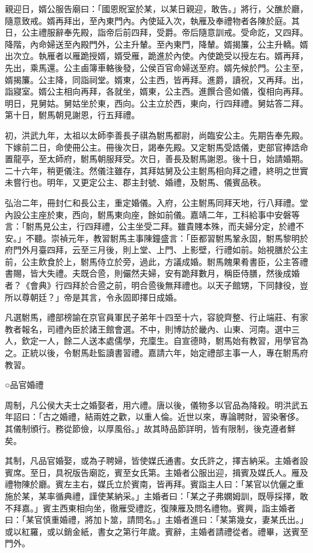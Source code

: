 親迎日，婿公服告廟曰：「國恩貺室於某，以某日親迎，敢告。」將行，父醮於廳，隨意致戒。婿再拜出，至內東門內。內使延入次，執雁及奉禮物者各陳於庭。其日，公主禮服辭奉先殿，詣帝后前四拜，受爵。帝后隨意訓戒。受命訖，又四拜。降階，內命婦送至內殿門外，公主升輦。至內東門，降輦。婿揭簾，公主升轎。婿出次立。執雁者以雁跪授婿，婿受雁，跪進於內使。內使跪受以授左右。婿再拜，先出，乘馬還。公主鹵簿車輅後發，公侯百官命婦送至府。婿先候於門。公主至，婿揭簾。公主降，同詣祠堂。婿東，公主西，皆再拜。進爵，讀祝，又再拜。出，詣寢室。婿公主相向再拜，各就坐，婿東，公主西。進饌合巹如儀，復相向再拜。明日，見舅姑。舅姑坐於東，西向。公主立於西，東向，行四拜禮。舅姑答二拜。第十日，駙馬朝見謝恩，行五拜禮。

初，洪武九年，太祖以太師李善長子祺為駙馬都尉，尚臨安公主。先期告奉先殿。下嫁前二日，命使冊公主。冊後次日，謁奉先殿。又定駙馬受誥儀，吏部官捧誥命置龍亭，至太師府，駙馬朝服拜受。次日，善長及駙馬謝恩。後十日，始請婚期。二十六年，稍更儀注。然儀注雖存，其拜姑舅及公主駙馬相向拜之禮，終明之世實未嘗行也。明年，又更定公主、郡主封號、婚禮，及駙馬、儀賓品秩。

弘治二年，冊封仁和長公主，重定婚儀。入府，公主駙馬同拜天地，行八拜禮。堂內設公主座於東，西向，駙馬東向座，餘如前儀。嘉靖二年，工科給事中安磐等言：「駙馬見公主，行四拜禮，公主坐受二拜。雖貴賤本殊，而夫婦分定，於禮不安。」不聽。崇禎元年，教習駙馬主事陳鐘盛言：「臣都習駙馬鞏永固，駙馬黎明於府門外月臺四拜，云至三月後，則上堂、上門、上影壁，行禮如前。始視膳於公主前，公主飲食於上，駙馬侍立於旁，過此，方議成婚。駙馬餽果肴書臣，公主答禮書賜，皆大失禮。夫既合巹，則儼然夫婦，安有跪拜數月，稱臣侍膳，然後成婚者？《會典》行四拜於合巹之前，明合巹後無拜禮也。以天子館甥，下同隸役，豈所以尊朝廷？」帝是其言，令永固即擇日成婚。

凡選駙馬，禮部榜諭在京官員軍民子弟年十四至十六，容貌齊整、行止端莊、有家教者報名，司禮內臣於諸王館會選。不中，則博訪於畿內、山東、河南。選中三人，欽定一人，餘二人送本處儒學，充廩生。自宣德時，駙馬始有教習，用學官為之。正統以後，令駙馬赴監讀書習禮。嘉請六年，始定禮部主事一人，專在駙馬府教習。

○品官婚禮

周制，凡公侯大夫士之婚娶者，用六禮。唐以後，儀物多以官品為降殺。明洪武五年詔曰：「古之婚禮，結兩姓之歡，以重人倫。近世以來，專論聘財，習染奢侈。其儀制頒行。務從節儉，以厚風俗。」故其時品節詳明，皆有限制，後克遵者鮮矣。

其制，凡品官婚娶，或為子聘婦，皆使媒氏通書。女氏許之，擇吉納采。主婚者設賓席。至日，具祝版告廟訖，賓至女氏第。主婚者公服出迎，揖賓及媒氏人。雁及禮物陳於廳。賓左主右，媒氏立於賓南，皆再拜。賓詣主人曰：「某官以伉儷之重施於某，某率循典禮，謹使某納采。」主婚者曰：「某之子弗嫻姆訓，既辱採擇，敢不拜嘉。」賓主西東相向坐，徹雁受禮訖，復陳雁及問名禮物。賓興，詣主婚者曰：「某官慎重婚禮，將加卜筮，請問名。」主婚者進曰：「某第幾女，妻某氏出。」或以紅羅，或以銷金紙，書女之第行年歲。賓辭，主婚者請禮從者。禮畢，送賓至門外。

